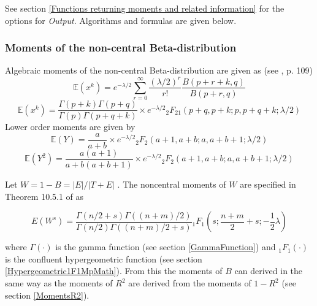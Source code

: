 \vspace{0.3cm}

See section \ref{Functions returning moments and related information} for the options for {\itshape\sffamily Output}. Algorithms and formulas are given below.

\subsubsection{Moments of the non-central Beta-distribution}


\label{Special case: moments of the non-central Beta-distribution}
Algebraic moments of the non-central Beta-distribution are given  as (see \cite{walck_2007}, p. 109)
\begin{equation}
	\mathbb{E}(x^k) = e^{-\lambda/2} \sum_{r=0}^{\infty} \frac{(\lambda/2)^r}{r!} \frac{B(p+r+k,q)}{B(p+r,q)}
\end{equation}
\begin{equation}
	\mathbb{E}(x^k) = \frac{\Gamma(p+k) \Gamma(p+q)}{\Gamma(p) \Gamma(p+q+k)} \times e^{-\lambda/2}  {}_2F_21(p+q,p+k;p,p+q+k;\lambda/2)
\end{equation}
Lower order moments are given by
\begin{equation}
	\mathbb{E}(Y) = \frac{a}{a+b} \times e^{-\lambda/2}  {}_2F_2(a+1,a+b;a,a+b+1;\lambda/2)
\end{equation}
\begin{equation}
	\mathbb{E}(Y^2) = \frac{a(a+1)}{a+b(a+b+1)} \times e^{-\lambda/2}  {}_2F_2(a+1,a+b;a,a+b+1;\lambda/2)
\end{equation}

Let $W = 1-B = | E | / | T + E |$ . The noncentral moments of $W$ are specified in Theorem 10.5.1 of \cite{Muirhead_1982} as

\begin{equation}
	E(W^s) = \frac{\Gamma(n/2 + s)\Gamma((n + m)/2)}{\Gamma(n/2)\Gamma((n + m)/2 + s)} {}_1F_1\left(s ;\frac{n + m}{2}+ s ; -\frac{1}{2}\lambda\right)
\end{equation}

where $\Gamma(\cdot)$ is the gamma function (see section \ref{GammaFunction}) and ${}_1F_1(\cdot)$ is the confluent hypergeometric function (see section \ref{Hypergeometric1F1MpMath}). 
From this the moments of $B$ can derived in the same way as the moments of $R^2$ are derived from the moments of $1-R^2$ (see section \ref{MomentsR2}).





